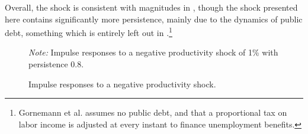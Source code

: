 Overall, the shock is consistent with magnitudes in \citet{gornemann2016doves}, though the shock presented here contains significantly more persistence, mainly due to the dynamics of public debt, something which is entirely left out in \citet{gornemann2016doves}.\footnote{Gornemann et al. assumes no public debt, and that a proportional tax on labor income is adjusted at every instant to finance unemployment benefits.}



\begin{figure}[H]
\caption[Caption for LOF]{Impulse responses to a negative productivity shock.}
\label{fig:baseline_impulse}
\scriptsize
\centering
\emph{Note:} Impulse responses to a negative productivity shock of 1\% with persistence 0.8. 
\end{figure}


